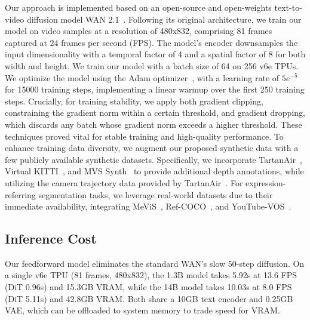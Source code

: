 \documentclass[11pt, a4paper, logo, onecolumn]{googledeepmind}
\begin{document}
Our approach is implemented based on an open-source and open-weights text-to-video diffusion model WAN 2.1~\cite{wan2025}. 
Following its original architecture, we train our model on video samples at a resolution of 480x832, comprising 81 frames captured at 24 frames per second (FPS). The model's encoder downsamples the input dimensionality with a temporal factor of 4 and a spatial factor of 8 for both width and height.
We train our model with a batch size of 64 on 256 v6e TPUs.
We optimize the model using the Adam optimizer~\cite{kingma2014adam}, with a learning rate of $5e^{-5}$ for 15000 training steps, implementing a linear warmup over the first 250 training steps.
Crucially, for training stability, we apply both gradient clipping, constraining the gradient norm within a certain threshold, and gradient dropping, which discards any batch whose gradient norm exceeds a higher threshold. These techniques proved vital for stable training and high-quality performance.
To enhance training data diversity, we augment our proposed synthetic data with a few publicly available synthetic datasets. Specifically, we incorporate TartanAir~\cite{wang2020tartanair}, Virtual KITTI~\cite{gaidon2016virtual}, and MVS Synth~\cite{huang2018deepmvs} to provide additional depth annotations, while utilizing the camera trajectory data provided by TartanAir~\cite{wang2020tartanair}. For expression-referring segmentation tasks, we leverage real-world datasets due to their immediate availability, integrating MeViS~\cite{ding2023mevis}, Ref-COCO~\cite{yu2016modeling}, and YouTube-VOS~\cite{xu2018youtube}.


\subsection{Inference Cost}
Our feedforward model eliminates the standard WAN's slow 50-step diffusion.
On a single v6e TPU (81 frames, 480x832), the 1.3B model takes 5.92s at 13.6 FPS (DiT 0.96s) and 15.3GB VRAM, while the 14B model takes 10.03s at 8.0 FPS (DiT 5.11s) and 42.8GB VRAM. Both share a 10GB text encoder and 0.25GB VAE, which can be offloaded to system memory to trade speed for VRAM.
\end{document}
